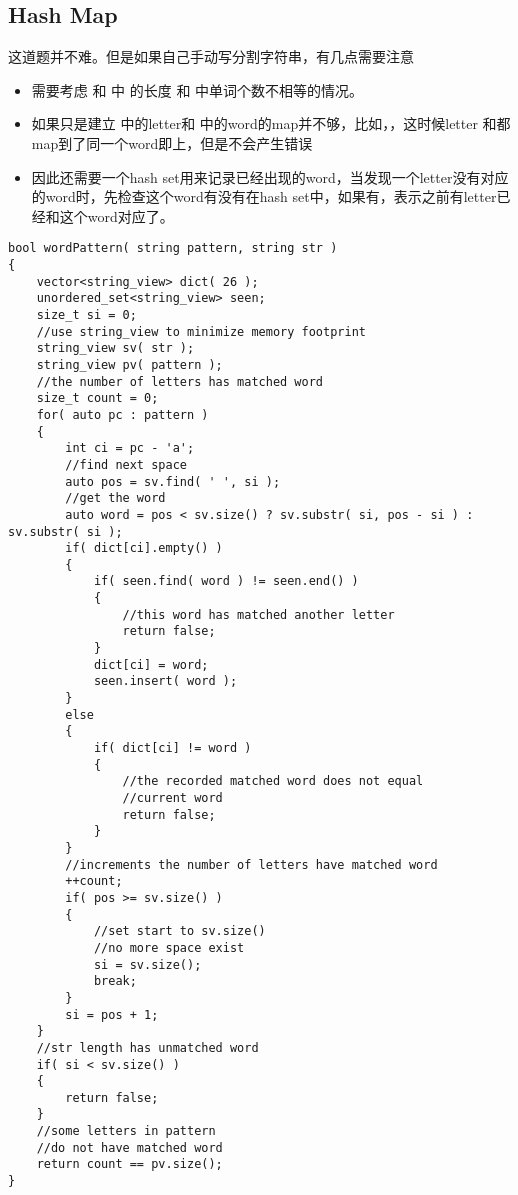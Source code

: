 \subsection{Hash Map}
这道题并不难。但是如果自己手动写分割字符串，有几点需要注意
\begin{itemize}
\item 需要考虑  和   中   的长度 和   中单词个数不相等的情况。
\item 如果只是建立  中的letter和   中的word的map并不够，比如，，这时候letter 和都map到了同一个word即上，但是不会产生错误
\item 因此还需要一个hash set用来记录已经出现的word，当发现一个letter没有对应的word时，先检查这个word有没有在hash set中，如果有，表示之前有letter已经和这个word对应了。
\end{itemize}
\setcounter{lstlisting}{0}
\begin{lstlisting}[style=customc, caption={Hash Map}]
bool wordPattern( string pattern, string str )
{
    vector<string_view> dict( 26 );
    unordered_set<string_view> seen;
    size_t si = 0;
    //use string_view to minimize memory footprint
    string_view sv( str );
    string_view pv( pattern );
    //the number of letters has matched word
    size_t count = 0;
    for( auto pc : pattern )
    {
        int ci = pc - 'a';
        //find next space
        auto pos = sv.find( ' ', si );
        //get the word
        auto word = pos < sv.size() ? sv.substr( si, pos - si ) : sv.substr( si );
        if( dict[ci].empty() )
        {
            if( seen.find( word ) != seen.end() )
            {
                //this word has matched another letter
                return false;
            }
            dict[ci] = word;
            seen.insert( word );
        }
        else
        {
            if( dict[ci] != word )
            {
                //the recorded matched word does not equal
                //current word
                return false;
            }
        }
        //increments the number of letters have matched word
        ++count;
        if( pos >= sv.size() )
        {
            //set start to sv.size()
            //no more space exist
            si = sv.size();
            break;
        }
        si = pos + 1;
    }
    //str length has unmatched word
    if( si < sv.size() )
    {
        return false;
    }
    //some letters in pattern
    //do not have matched word
    return count == pv.size();
}
\end{lstlisting}

